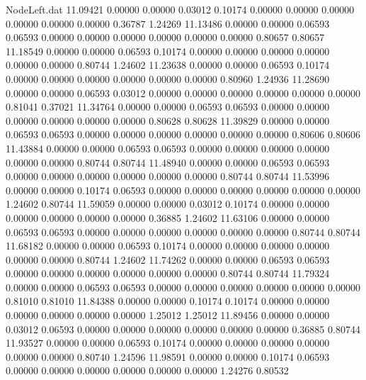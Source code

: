 \begin{filecontents}{NodeLeft.dat}
  11.09421    0.00000    0.00000     0.03012    0.10174    0.00000    0.00000    0.00000    0.00000    0.00000    0.00000    0.36787    1.24269
  11.13486    0.00000    0.00000     0.06593    0.06593    0.00000    0.00000    0.00000    0.00000    0.00000    0.00000    0.80657    0.80657
  11.18549    0.00000    0.00000     0.06593    0.10174    0.00000    0.00000    0.00000    0.00000    0.00000    0.00000    0.80744    1.24602
  11.23638    0.00000    0.00000     0.06593    0.10174    0.00000    0.00000    0.00000    0.00000    0.00000    0.00000    0.80960    1.24936
  11.28690    0.00000    0.00000     0.06593    0.03012    0.00000    0.00000    0.00000    0.00000    0.00000    0.00000    0.81041    0.37021
  11.34764    0.00000    0.00000     0.06593    0.06593    0.00000    0.00000    0.00000    0.00000    0.00000    0.00000    0.80628    0.80628
  11.39829    0.00000    0.00000     0.06593    0.06593    0.00000    0.00000    0.00000    0.00000    0.00000    0.00000    0.80606    0.80606
  11.43884    0.00000    0.00000     0.06593    0.06593    0.00000    0.00000    0.00000    0.00000    0.00000    0.00000    0.80744    0.80744
  11.48940    0.00000    0.00000     0.06593    0.06593    0.00000    0.00000    0.00000    0.00000    0.00000    0.00000    0.80744    0.80744
  11.53996    0.00000    0.00000     0.10174    0.06593    0.00000    0.00000    0.00000    0.00000    0.00000    0.00000    1.24602    0.80744
  11.59059    0.00000    0.00000     0.03012    0.10174    0.00000    0.00000    0.00000    0.00000    0.00000    0.00000    0.36885    1.24602
  11.63106    0.00000    0.00000     0.06593    0.06593    0.00000    0.00000    0.00000    0.00000    0.00000    0.00000    0.80744    0.80744
  11.68182    0.00000    0.00000     0.06593    0.10174    0.00000    0.00000    0.00000    0.00000    0.00000    0.00000    0.80744    1.24602
  11.74262    0.00000    0.00000     0.06593    0.06593    0.00000    0.00000    0.00000    0.00000    0.00000    0.00000    0.80744    0.80744
  11.79324    0.00000    0.00000     0.06593    0.06593    0.00000    0.00000    0.00000    0.00000    0.00000    0.00000    0.81010    0.81010
  11.84388    0.00000    0.00000     0.10174    0.10174    0.00000    0.00000    0.00000    0.00000    0.00000    0.00000    1.25012    1.25012
  11.89456    0.00000    0.00000     0.03012    0.06593    0.00000    0.00000    0.00000    0.00000    0.00000    0.00000    0.36885    0.80744
  11.93527    0.00000    0.00000     0.06593    0.10174    0.00000    0.00000    0.00000    0.00000    0.00000    0.00000    0.80740    1.24596
  11.98591    0.00000    0.00000     0.10174    0.06593    0.00000    0.00000    0.00000    0.00000    0.00000    0.00000    1.24276    0.80532

\end{filecontents}
